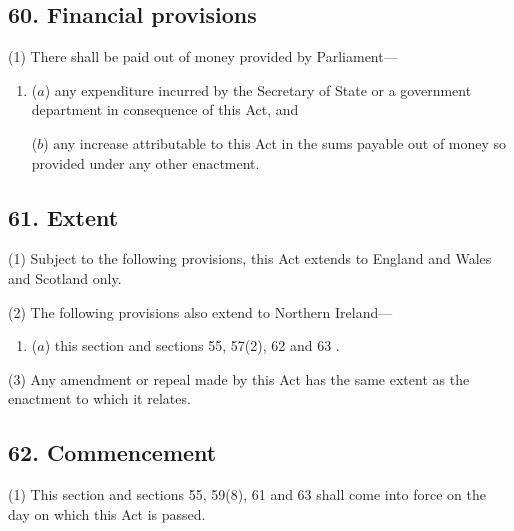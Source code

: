 \documentclass[12pt,a4paper]{article}
\begin{document}

\subsection{60. Financial provisions}

(1) There shall be paid out of money provided by Parliament—
\begin{enumerate}\item[]
($a$) any expenditure incurred by the Secretary of State or a government department in consequence of this Act, and

($b$) any increase attributable to this Act in the sums payable out of money so provided under any other enactment.
\end{enumerate}


\subsection{61. Extent}

(1) Subject to the following provisions, this Act extends to England and Wales and Scotland only.

(2) The following provisions also extend to Northern Ireland---
\begin{enumerate}\item[]
($a$) this section and sections 55, 57(2), 62 and 63%
%
.
\end{enumerate}

(3) Any amendment or repeal made by this Act has the same extent as the enactment to which it relates.


\subsection{62. Commencement}

(1) This section and sections 55, 59(8), 61 and 63 shall come into force on the day on which this Act is passed.
\end{document}

